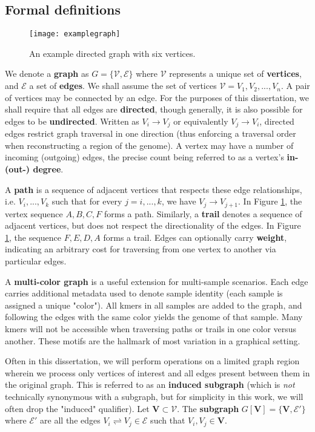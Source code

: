 \subsection{Formal definitions}

\begin{figure}[h!]
  \centering
    \texttt{[image: examplegraph]}
  \caption{An example directed graph with six vertices.}
  \label{fig:examplegraph}
\end{figure}

We denote a \textbf{graph} as $G = \{\mathcal{V}, \mathcal{E}\}$ where $\mathcal{V}$ represents a unique set of \textbf{vertices}, and $\mathcal{E}$ a set of \textbf{edges}\cite{Koller:2009ty}.  We shall assume the set of vertices $\mathcal{V} = V_1, V_2, ..., V_n$.  A pair of vertices may be connected by an edge.  For the purposes of this dissertation, we shall require that all edges are \textbf{directed}, though generally, it is also possible for edges to be \textbf{undirected}.  Written as $V_i \rightarrow V_j$ or equivalently $V_j \rightarrow V_i$, directed edges restrict graph traversal in one direction (thus enforcing a traversal order when reconstructing a region of the genome).  A vertex may have a number of incoming (outgoing) edges, the precise count being referred to as a vertex's \textbf{in- (out-) degree}.

A \textbf{path} is a sequence of adjacent vertices that respects these edge relationships, i.e. $V_i, ..., V_k$ such that for every $j = i, ..., k$, we have $V_j \rightarrow V_{j+1}$.  In Figure \ref{fig:examplegraph}, the vertex sequence $A, B, C, F$ forms a path.  Similarly, a \textbf{trail} denotes a sequence of adjacent vertices, but does not respect the directionality of the edges.  In Figure \ref{fig:examplegraph}, the sequence $F, E, D, A$ forms a trail.  Edges can optionally carry \textbf{weight}, indicating an arbitrary cost for traversing from one vertex to another via particular edges.

A \textbf{multi-color graph} is a useful extension for multi-sample scenarios.  Each edge carries additional metadata used to denote sample identity (each sample is assigned a unique "color").  All kmers in all samples are added to the graph, and following the edges with the same color yields the genome of that sample.  Many kmers will not be accessible when traversing paths or trails in one color versus another.  These motifs are the hallmark of most variation in a graphical setting.

Often in this dissertation, we will perform operations on a limited graph region wherein we process only vertices of interest and all edges present between them in the original graph.  This is referred to as an \textbf{induced subgraph} (which is \textit{not} technically synonymous with a subgraph, but for simplicity in this work, we will often drop the "induced" qualifier).  Let $\mathbf{V} \subset \mathcal{V}$.  The \textbf{subgraph} $G[\mathbf{V}] = \{\mathbf{V}, \mathcal{E'}\}$ where $\mathcal{E'}$ are all the edges $V_i \rightleftharpoons V_j \in \mathcal{E}$ such that $V_i, V_j \in \mathbf{V}$.

